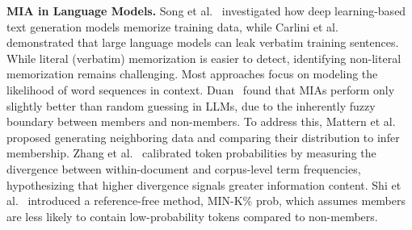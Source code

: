 

\textbf{MIA in Language Models.} Song et al.~\cite{song2019auditing} investigated how deep learning-based text generation models memorize training data, while Carlini et al.~\cite{carlini2021extracting} demonstrated that large language models can leak verbatim training sentences. While literal (verbatim) memorization is easier to detect, identifying non-literal memorization remains challenging. Most approaches focus on modeling the likelihood of word sequences in context. Duan~\cite{duan2024membership} found that MIAs perform only slightly better than random guessing in LLMs, due to the inherently fuzzy boundary between members and non-members.
To address this, Mattern et al.~\cite{mattern2023membership} proposed generating neighboring data and comparing their distribution to infer membership. Zhang et al.~\cite{zhang2024pretraining} calibrated token probabilities by measuring the divergence between within-document and corpus-level term frequencies, hypothesizing that higher divergence signals greater information content. Shi et al.~\cite{shi2023detecting} introduced a reference-free method, MIN-K\% prob, which assumes members are less likely to contain low-probability tokens compared to non-members.

